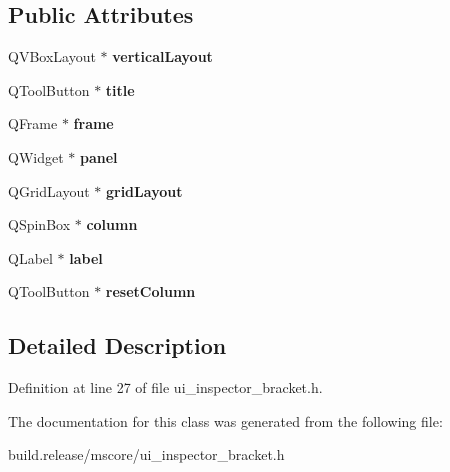 \subsection*{Public Attributes}
\begin{DoxyCompactItemize}
\item 
\mbox{\label{class_ui___inspector_bracket_a6168f7e2adeb2ed324dc7f076a5bc80e}} 
Q\+V\+Box\+Layout $\ast$ {\bfseries vertical\+Layout}
\item 
\mbox{\label{class_ui___inspector_bracket_ac46abadfd74e6ca27787e40619a28ba9}} 
Q\+Tool\+Button $\ast$ {\bfseries title}
\item 
\mbox{\label{class_ui___inspector_bracket_a50712aca66c12a4b7a3723c19341801f}} 
Q\+Frame $\ast$ {\bfseries frame}
\item 
\mbox{\label{class_ui___inspector_bracket_a16337b4355d988023a96b306c0e92194}} 
Q\+Widget $\ast$ {\bfseries panel}
\item 
\mbox{\label{class_ui___inspector_bracket_ac6d49c81cdc38f52b236696efcaccd74}} 
Q\+Grid\+Layout $\ast$ {\bfseries grid\+Layout}
\item 
\mbox{\label{class_ui___inspector_bracket_ae90fe60d233726c7e926eb2738f83b6d}} 
Q\+Spin\+Box $\ast$ {\bfseries column}
\item 
\mbox{\label{class_ui___inspector_bracket_a6fc40858379c47cc2fcc51c53c97e622}} 
Q\+Label $\ast$ {\bfseries label}
\item 
\mbox{\label{class_ui___inspector_bracket_a64addd3b977c3209c345ed99ba8abe40}} 
Q\+Tool\+Button $\ast$ {\bfseries reset\+Column}
\end{DoxyCompactItemize}


\subsection{Detailed Description}


Definition at line 27 of file ui\+\_\+inspector\+\_\+bracket.\+h.



The documentation for this class was generated from the following file\+:\begin{DoxyCompactItemize}
\item 
build.\+release/mscore/ui\+\_\+inspector\+\_\+bracket.\+h\end{DoxyCompactItemize}
